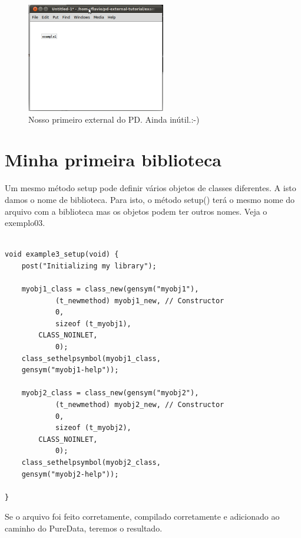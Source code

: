 \documentclass[10pt,a4paper]{report}
\begin{document}
\begin{figure}[h!]
	\centering
	\includegraphics[height=180]{./images/example1}
	\caption{Nosso primeiro external do PD. Ainda inútil.:-)}
\end{figure}

\section{Minha primeira biblioteca}

Um mesmo método setup pode definir vários objetos de classes diferentes. A isto damos o nome de biblioteca. Para isto, o método setup() terá o mesmo nome do arquivo com a biblioteca mas os objetos podem ter outros nomes. Veja o exemplo03.

\begin{lstlisting}

void example3_setup(void) {
    post("Initializing my library");

    myobj1_class = class_new(gensym("myobj1"),
            (t_newmethod) myobj1_new, // Constructor
            0,
            sizeof (t_myobj1),
	    CLASS_NOINLET,
            0);
    class_sethelpsymbol(myobj1_class, 
	gensym("myobj1-help"));

    myobj2_class = class_new(gensym("myobj2"),
            (t_newmethod) myobj2_new, // Constructor
            0,
            sizeof (t_myobj2),
	    CLASS_NOINLET,
            0);
    class_sethelpsymbol(myobj2_class, 
	gensym("myobj2-help"));

}
\end{lstlisting}

Se o arquivo foi feito corretamente, compilado corretamente e adicionado ao caminho do PureData, teremos o resultado.
\end{document}
